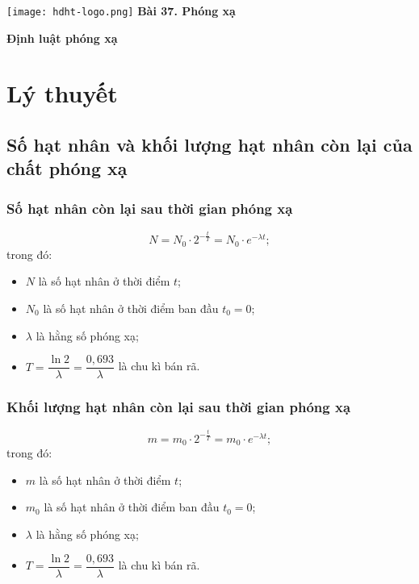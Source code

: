 \newcommand{\chapter}[2][]{
	\newcommand{\chapname}{#2}
	\begin{flushleft}
		\begin{minipage}[t]{\linewidth}
			\texttt{[image: hdht-logo.png]}
			\hspace{0pt}	
			\sffamily\bfseries\large Bài  37. Phóng xạ
			\begin{flushleft}
				\huge\bfseries #1
			\end{flushleft}
		\end{minipage}
	\end{flushleft}
	\vspace{1cm}
	\normalfont\normalsize
}
\chapter[Định luật phóng xạ]{Định luật phóng xạ}
\section{Lý thuyết}


\subsection{Số hạt nhân và khối lượng hạt nhân còn lại của chất phóng xạ}

	\subsubsection{Số hạt nhân còn lại sau thời gian phóng xạ}
	\begin{equation}
	N=N_0\cdot 2^{-\frac{t}{T}}=N_0\cdot e^{-\lambda t};
	\end{equation}
	trong đó:
	\begin{itemize}
		\item $N$ là số hạt nhân ở thời điểm $t$;
		\item $N_0$ là số hạt nhân ở thời điểm ban đầu $t_0=0$;
		\item $\lambda$ là hằng số phóng xạ;
		\item $T=\dfrac{\ln2}{\lambda}=\dfrac{0,693}{\lambda}$ là chu kì bán rã.
	\end{itemize}
	\subsubsection{Khối lượng hạt nhân còn lại sau thời gian phóng xạ}
	\begin{equation}
	m=m_0\cdot 2^{-\frac{t}{T}}=m_0\cdot e^{-\lambda t};
	\end{equation}
	trong đó:
	\begin{itemize}
		\item $m$ là số hạt nhân ở thời điểm $t$;
		\item $m_0$ là số hạt nhân ở thời điểm ban đầu $t_0=0$;
		\item $\lambda$ là hằng số phóng xạ;
		\item $T=\dfrac{\ln2}{\lambda}=\dfrac{0,693}{\lambda}$ là chu kì bán rã.
	\end{itemize}
